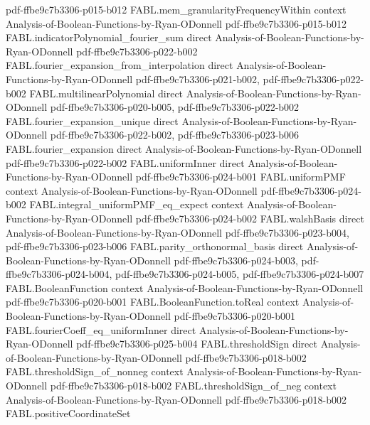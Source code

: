 \begin{theorem}
  {pdf-ffbe9c7b3306-p015-b012}
\proofstep
  {FABL.mem_granularityFrequencyWithin}
  {context}
  {Analysis-of-Boolean-Functions-by-Ryan-ODonnell}
  {pdf-ffbe9c7b3306-p015-b012}
\proofstep
  {FABL.indicatorPolynomial_fourier_sum}
  {direct}
  {Analysis-of-Boolean-Functions-by-Ryan-ODonnell}
  {pdf-ffbe9c7b3306-p022-b002}
\proofstep
  {FABL.fourier_expansion_from_interpolation}
  {direct}
  {Analysis-of-Boolean-Functions-by-Ryan-ODonnell}
  {pdf-ffbe9c7b3306-p021-b002,
    pdf-ffbe9c7b3306-p022-b002}
\proofstep
  {FABL.multilinearPolynomial}
  {direct}
  {Analysis-of-Boolean-Functions-by-Ryan-ODonnell}
  {pdf-ffbe9c7b3306-p020-b005,
    pdf-ffbe9c7b3306-p022-b002}
\proofstep
  {FABL.fourier_expansion_unique}
  {direct}
  {Analysis-of-Boolean-Functions-by-Ryan-ODonnell}
  {pdf-ffbe9c7b3306-p022-b002,
    pdf-ffbe9c7b3306-p023-b006}
\proofstep
  {FABL.fourier_expansion}
  {direct}
  {Analysis-of-Boolean-Functions-by-Ryan-ODonnell}
  {pdf-ffbe9c7b3306-p022-b002}
\proofstep
  {FABL.uniformInner}
  {direct}
  {Analysis-of-Boolean-Functions-by-Ryan-ODonnell}
  {pdf-ffbe9c7b3306-p024-b001}
\proofstep
  {FABL.uniformPMF}
  {context}
  {Analysis-of-Boolean-Functions-by-Ryan-ODonnell}
  {pdf-ffbe9c7b3306-p024-b002}
\proofstep
  {FABL.integral_uniformPMF_eq_expect}
  {context}
  {Analysis-of-Boolean-Functions-by-Ryan-ODonnell}
  {pdf-ffbe9c7b3306-p024-b002}
\proofstep
  {FABL.walshBasis}
  {direct}
  {Analysis-of-Boolean-Functions-by-Ryan-ODonnell}
  {pdf-ffbe9c7b3306-p023-b004,
    pdf-ffbe9c7b3306-p023-b006}
\proofstep
  {FABL.parity_orthonormal_basis}
  {direct}
  {Analysis-of-Boolean-Functions-by-Ryan-ODonnell}
  {pdf-ffbe9c7b3306-p024-b003,
    pdf-ffbe9c7b3306-p024-b004,
    pdf-ffbe9c7b3306-p024-b005,
    pdf-ffbe9c7b3306-p024-b007}
\proofstep
  {FABL.BooleanFunction}
  {context}
  {Analysis-of-Boolean-Functions-by-Ryan-ODonnell}
  {pdf-ffbe9c7b3306-p020-b001}
\proofstep
  {FABL.BooleanFunction.toReal}
  {context}
  {Analysis-of-Boolean-Functions-by-Ryan-ODonnell}
  {pdf-ffbe9c7b3306-p020-b001}
\proofstep
  {FABL.fourierCoeff_eq_uniformInner}
  {direct}
  {Analysis-of-Boolean-Functions-by-Ryan-ODonnell}
  {pdf-ffbe9c7b3306-p025-b004}
\proofstep
  {FABL.thresholdSign}
  {direct}
  {Analysis-of-Boolean-Functions-by-Ryan-ODonnell}
  {pdf-ffbe9c7b3306-p018-b002}
\proofstep
  {FABL.thresholdSign_of_nonneg}
  {context}
  {Analysis-of-Boolean-Functions-by-Ryan-ODonnell}
  {pdf-ffbe9c7b3306-p018-b002}
\proofstep
  {FABL.thresholdSign_of_neg}
  {context}
  {Analysis-of-Boolean-Functions-by-Ryan-ODonnell}
  {pdf-ffbe9c7b3306-p018-b002}
\proofstep
  {FABL.positiveCoordinateSet}

\end{theorem}
